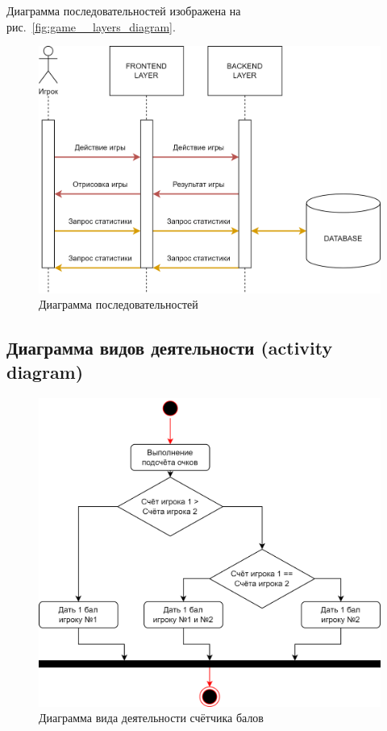 \documentclass[12pt, a4paper, simple]{eskdtext}
\begin{document}
    Диаграмма последовательностей изображена на рис.~\ref{fig:game__layers_diagram}.

    \begin{figure}[!h]
        \centering
        \includegraphics[width=12cm]
            {../sources/game_architecture/build/game__sequence_diagram.png}
        \caption{Диаграмма последовательностей}
        \label{fig:game__sequence_diagram}
    \end{figure}
    
    \newpage
    \subsection{Диаграмма видов деятельности (activity diagram)}

    \begin{figure}[!h]
        \centering
        \includegraphics[]
            {../sources/game_architecture/build/game__activity_diagram.png}
        \caption{Диаграмма вида деятельности счётчика балов}
    \end{figure}
\end{document}
